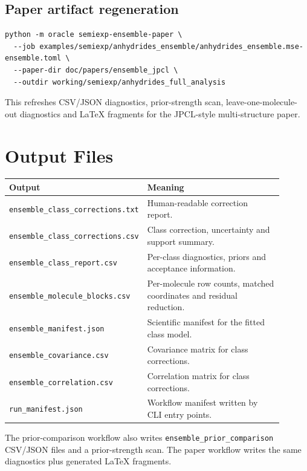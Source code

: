 \documentclass[11pt]{article}
\begin{document}
\subsection{Paper artifact regeneration}

\begin{lstlisting}[style=oracle]
python -m oracle semiexp-ensemble-paper \
  --job examples/semiexp/anhydrides_ensemble/anhydrides_ensemble.mse-ensemble.toml \
  --paper-dir doc/papers/ensemble_jpcl \
  --outdir working/semiexp/anhydrides_full_analysis
\end{lstlisting}

\noindent
This refreshes CSV/JSON diagnostics, prior-strength scan, leave-one-molecule-out
diagnostics and LaTeX fragments for the JPCL-style multi-structure paper.

\section{Output Files}

\begin{longtable}{@{}p{0.40\linewidth}p{0.50\linewidth}@{}}
\toprule
Output & Meaning \\
\midrule
\endhead
\texttt{ensemble\_class\_corrections.txt} & Human-readable correction report. \\
\texttt{ensemble\_class\_corrections.csv} & Class correction, uncertainty and
support summary. \\
\texttt{ensemble\_class\_report.csv} & Per-class diagnostics, priors and
acceptance information. \\
\texttt{ensemble\_molecule\_blocks.csv} & Per-molecule row counts, matched
coordinates and residual reduction. \\
\texttt{ensemble\_manifest.json} & Scientific manifest for the fitted class
model. \\
\texttt{ensemble\_covariance.csv} & Covariance matrix for class corrections. \\
\texttt{ensemble\_correlation.csv} & Correlation matrix for class corrections. \\
\texttt{run\_manifest.json} & Workflow manifest written by CLI entry points. \\
\bottomrule
\end{longtable}

The prior-comparison workflow also writes \texttt{ensemble\_prior\_comparison}
CSV/JSON files and a prior-strength scan.  The paper workflow writes the same
diagnostics plus generated LaTeX fragments.
\end{document}
